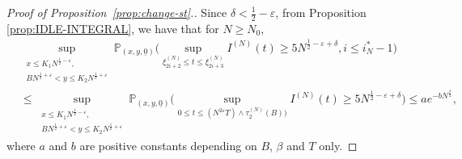 \documentclass[11pt, reqno]{article}
\numberwithin{equation}{section}
\numberwithin{theorem}{section}
\begin{document}
\begin{appendix}
\begin{proof}[Proof of Proposition~\ref{prop:change-st}.]
Since $\delta<\frac{1}{2}-\varepsilon$,
from Proposition \ref{prop:IDLE-INTEGRAL}, we have that for $N\geq N_0$, 
\begin{align}\label{eq:prop-A3-5}
&\sup_{\substack{x\leq K_1N^{\frac{1}{2} - \varepsilon},\\ BN^{\frac{1}{2} + \varepsilon} <y\leq K_2N^{\frac{1}{2} + \varepsilon}}}\mathbb{P}_{(x,y, \underline{0})}\Big(\sup_{\xi^{(N)}_{2i+2}\leq t\leq \xi^{(N)}_{2i+3}}I^{(N)}(t)\geq 5 N^{\frac{1}{2}-\varepsilon+\delta}, i\leq i^*_N-1\Big)\nonumber\\
    &\le \sup_{\substack{x\leq K_1N^{\frac{1}{2} - \varepsilon},\\ BN^{\frac{1}{2} + \varepsilon} <y\leq K_2N^{\frac{1}{2} + \varepsilon}}}\mathbb{P}_{(x,y, \underline{0})}\big(\sup_{0\leq t\leq (N^{2\varepsilon}T)\wedge \tau^{(N)}_2(B))}I^{(N)}(t)\geq 5 N^{\frac{1}{2}-\varepsilon+\delta}\big)\leq ae^{-bN^{\frac{\delta}{2}}},
\end{align}
where $a$ and $b$ are positive constants depending on $B$, $\beta$ and $T$ only. 


\end{proof}
\end{appendix}
\end{document}

